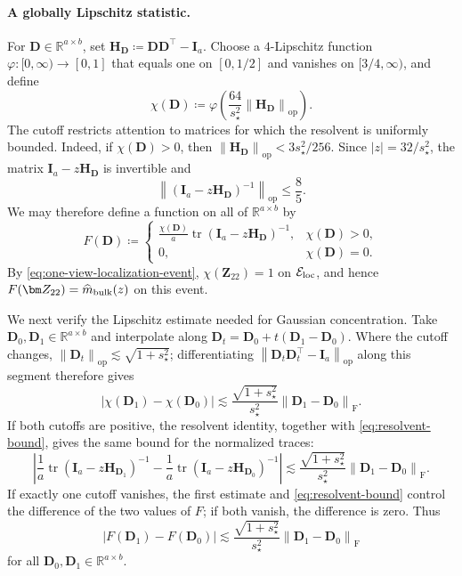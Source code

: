 \documentclass[11pt]{article}
\newcommand{\trans}{\top}
\DeclareMathOperator{\tr}{tr}
\newcommand{\opn}[1]{\left\lVert #1\right\rVert_{\mathrm{op}}}
\newcommand{\frn}[1]{\left\lVert #1\right\rVert_{\mathrm{F}}}
\newcommand{\cE}{\mathcal{E}}
\begin{document}
\paragraph{A globally Lipschitz statistic.}
For $\bm D\in\mathbb R^{a\times b}$, set
$\bm H_{\bm D}\coloneqq\bm D\bm D^\trans-\bm I_a$. Choose a
$4$-Lipschitz function $\varphi:[0,\infty)\to[0,1]$ that equals one on
$[0,1/2]$ and vanishes on $[3/4,\infty)$, and define
\begin{equation}
\label{eq:cutoff}
  \chi(\bm D)
  \coloneqq
  \varphi\!\left(
    \frac{64}{s_\star^2}\opn{\bm H_{\bm D}}
  \right).
\end{equation}
The cutoff restricts attention to matrices for which the resolvent is
uniformly bounded. Indeed, if $\chi(\bm D)>0$, then
$\opn{\bm H_{\bm D}}<3s_\star^2/256$. Since
$|z|=32/s_\star^2$, the matrix $\bm I_a-z\bm H_{\bm D}$ is invertible and
\begin{equation}
\label{eq:resolvent-bound}
  \opn{
    (\bm I_a-z\bm H_{\bm D})^{-1}
  }
  \le\frac85.
\end{equation}
We may therefore define a function on all of $\mathbb R^{a\times b}$ by
\begin{equation}
\label{eq:F-def}
  F(\bm D)
  \coloneqq
  \begin{cases}
    \displaystyle
    \frac{\chi(\bm D)}{a}
    \tr(\bm I_a-z\bm H_{\bm D})^{-1},
    &\chi(\bm D)>0,\\[6pt]
    0,&\chi(\bm D)=0.
  \end{cases}
\end{equation}
By \cref{eq:one-view-localization-event}, $\chi(\bm Z_{22})=1$ on
$\cE_{\rm loc}$, and hence
$F(\bm Z_{22})=\widehat m_{\rm bulk}(z)$ on this event.

We next verify the Lipschitz estimate needed for Gaussian concentration.
Take $\bm D_0,\bm D_1\in\mathbb R^{a\times b}$ and interpolate along
$\bm D_t=\bm D_0+t(\bm D_1-\bm D_0)$. Where the cutoff changes,
$\opn{\bm D_t}\lesssim\sqrt{1+s_\star^2}$; differentiating
$\opn{\bm D_t\bm D_t^\trans-\bm I_a}$ along this segment therefore gives
\[
  |\chi(\bm D_1)-\chi(\bm D_0)|
  \lesssim
  \frac{\sqrt{1+s_\star^2}}{s_\star^2}
  \frn{\bm D_1-\bm D_0}.
\]
If both cutoffs are positive, the resolvent identity, together with
\cref{eq:resolvent-bound}, gives the same bound for the normalized traces:
\[
  \left|
    \frac1a\tr(\bm I_a-z\bm H_{\bm D_1})^{-1}
    -
    \frac1a\tr(\bm I_a-z\bm H_{\bm D_0})^{-1}
  \right|
  \lesssim
  \frac{\sqrt{1+s_\star^2}}{s_\star^2}
  \frn{\bm D_1-\bm D_0}.
\]
If exactly one cutoff vanishes, the first estimate and
\cref{eq:resolvent-bound} control the difference of the two values of $F$;
if both vanish, the difference is zero. Thus
\begin{equation}
\label{eq:F-Lip-D}
  |F(\bm D_1)-F(\bm D_0)|
  \lesssim
  \frac{\sqrt{1+s_\star^2}}{s_\star^2}
  \frn{\bm D_1-\bm D_0}
\end{equation}
for all $\bm D_0,\bm D_1\in\mathbb R^{a\times b}$.
\end{document}
